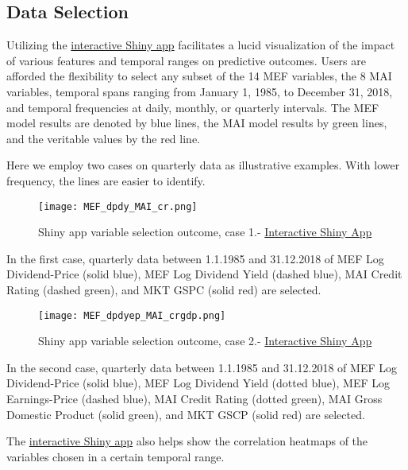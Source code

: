 \documentclass{article}
\begin{document}
\newpage

\subsection{Data Selection}
Utilizing the \href{https://baumender11.shinyapps.io/Alpha/}{interactive Shiny app} facilitates a lucid visualization of the impact of various features and temporal ranges on predictive outcomes. Users are afforded the flexibility to select any subset of the 14 MEF variables, the 8 MAI variables, temporal spans ranging from January 1, 1985, to December 31, 2018, and temporal frequencies at daily, monthly, or quarterly intervals. The MEF model results are denoted by blue lines, the MAI model results by green lines, and the veritable values by the red line.

Here we employ two cases on quarterly data as illustrative examples. With lower frequency, the lines are easier to identify.

\begin{figure}[H]
    \centering \texttt{[image: MEF\_dpdy\_MAI\_cr.png]}
    \caption{Shiny app variable selection outcome, case 1.- \href{https://baumender11.shinyapps.io/Alpha/}{Interactive Shiny App}}
\end{figure}

In the first case, quarterly data between 1.1.1985 and 31.12.2018 of MEF Log Dividend-Price (solid blue), MEF Log Dividend Yield (dashed blue), MAI Credit Rating (dashed green), and MKT GSPC (solid red) are selected.

\begin{figure}[H]
    \centering \texttt{[image: MEF\_dpdyep\_MAI\_crgdp.png]}
    \caption{Shiny app variable selection outcome, case 2.- \href{https://baumender11.shinyapps.io/Alpha/}{Interactive Shiny App}}
\end{figure}

In the second case, quarterly data between 1.1.1985 and 31.12.2018 of MEF Log Dividend-Price (solid blue), MEF Log Dividend Yield (dotted blue), MEF Log Earnings-Price (dashed blue), MAI Credit Rating (dotted green), MAI Gross Domestic Product (solid green), and MKT GSCP (solid red) are selected.

The \href{https://baumender11.shinyapps.io/Alpha/}{interactive Shiny app} also helps show the correlation heatmaps of the variables chosen in a certain temporal range.
\end{document}
